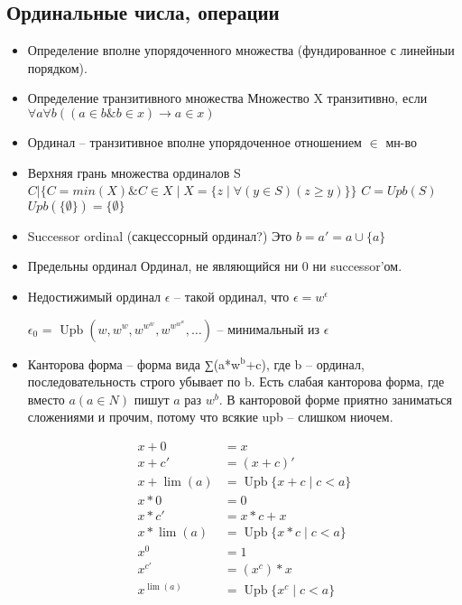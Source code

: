 \subsection{Ординальные числа, операции}
\label{sec-2-41}
\begin{itemize}
\item Определение вполне упорядоченного множества (фундированное
с линейныи порядком).
\item Определение транзитивного множества
Множество X транзитивно, если
$\forall a \forall b((a \in b \& b \in x) \to a \in x)$
\item Ординал -- транзитивное вполне упорядоченное отношением $\in$ мн-во
\item Верхняя грань множества ординалов S
$C | \{C = min(X) \& C \in X \mid X = \{z \mid \forall (y\in S)(z \ge y)\}\}$
$C = Upb(S)$
$Upb(\{\emptyset\}) = \{\emptyset\}$
\item Successor ordinal (сакцессорный ординал?)
Это $b = a' = a \cup \{a\}$
\item Предельны ординал
Ординал, не являющийся ни 0 ни successor'ом.
\item Недостижимый ординал
$\epsilon$ -- такой ординал, что $\epsilon  = w^\epsilon $

$\epsilon_0$ = $\operatorname{Upb}(w, w^w, w^{w^w}, w^{w^{w^w}}, \dotsc)$ -- минимальный из $\epsilon$
\item Канторова форма -- форма вида ∑(a*w$^{\text{b}}$+c), где b -- ординал, последовательность
строго убывает по b. Есть слабая канторова форма, где вместо $a (a \in N)$
пишут $a$ раз $w^b$. В канторовой форме приятно заниматься сложениями и
прочим, потому что всякие upb -- слишком ниочем.

\begin{align*}
x + 0      &= x \\
x + c'     &= (x + c)' \\
x + \lim(a) &= \operatorname{Upb}\{x + c \mid c < a\} \\
x * 0      &= 0 \\
x * c'     &= x * c + x \\
x * \lim(a) &= \operatorname{Upb}\{x * c \mid c < a\} \\
x ^ 0      &= 1 \\
x ^ {c'}     &= (x ^ c) * x \\
x ^ {\lim(a)} &= \operatorname{Upb}\{x ^ c \mid c < a\}
\end{align*}
\end{itemize}
